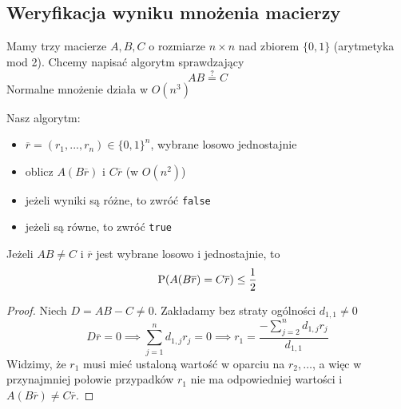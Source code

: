 \subsection{Weryfikacja wyniku mnożenia macierzy}
Mamy trzy macierze \(A, B, C\) o rozmiarze \(n \times n\) nad zbiorem \(\{0,1\}\) (arytmetyka mod 2). Chcemy napisać algorytm sprawdzający
\[
	AB \overset{?}{=} C
\]
Normalne mnożenie działa w \(O(n^3)\) 

Nasz algorytm:
\begin{itemize}
    \item \(\overline{r} = (r_1, ..., r_n) \in \{0,1\}^n\), wybrane losowo jednostajnie
    \item oblicz \(A(B\overline{r})\) i \(C\overline{r}\) (w \(O(n^2)\))
    \item jeżeli wyniki są różne, to zwróć \texttt{false}
    \item jeżeli są równe, to zwróć \texttt{true}
\end{itemize}

Jeżeli \(AB \neq C\) i \(\overline{r}\) jest wybrane losowo i jednostajnie, to 
\[
	\operatorname{P}(A(B\overline{r}) = C\overline{r}) \leq \frac{1}{2}
\]

\begin{proof}
	Niech \(D = AB-C \neq 0\). Zakładamy bez straty ogólności \(d_{1,1} \neq 0\)
	\[
		D\overline{r} = 0 \implies \sum_{j=1}^n d_{1,j} r_j = 0 \implies r_1 = \frac{-\sum_{j=2}^n d_{1,j} r_j}{d_{1,1}}
	\]
	Widzimy, że \(r_1\) musi mieć ustaloną wartość w oparciu na \(r_2, \dots\), a więc w przynajmniej połowie przypadków \(r_1\) nie ma odpowiedniej wartości i \(A(B\overline{r}) \neq C\overline{r}\).
\end{proof}
